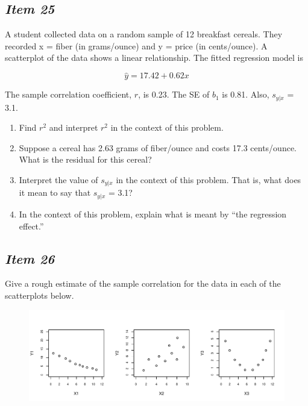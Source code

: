 \subsection{\textbf{\textit{Item 25}}}
A student collected data on a random sample of 12 breakfast cereals.  They recorded x = fiber (in grams/ounce) and y = price (in cents/ounce).  A scatterplot of the data shows a linear relationship.  The fitted regression model is

\begin{equation*}
\hat{y} = 17.42 + 0.62x
\end{equation*}
  
The sample correlation coefficient, $r$, is 0.23.  The SE of $b_1$ is 0.81.   Also, $s_{y|x}$ = 3.1.
\begin{enumerate}[leftmargin=1cm, itemsep=.2em]
\item Find $r^2$ and interpret $r^2$ in the context of this problem.
\item Suppose a cereal has 2.63 grams of fiber/ounce and costs 17.3 cents/ounce.  What is the residual for this cereal?
\item Interpret the value of $s_{y|x}$ in the context of this problem.  That is, what does it mean to say that $s_{y|x}$ = 3.1?
\item In the context of this problem, explain what is meant by ``the regression effect.''
\end{enumerate}

\subsection{\textbf{\textit{Item 26}}}
Give a rough estimate of the sample correlation for the data in each of the scatterplots below.

\begin{figure}[ht]
\centering
\includegraphics[width=6.5in]{includes/Item19_R.pdf}
\end{figure}


